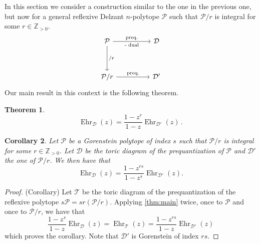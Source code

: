 \documentclass[a4paper,11pt,reqno]{amsart}
\DeclareMathOperator{\Ehr}{Ehr}
\newtheorem{theorem}{Theorem}[section]
\newtheorem{corollary}[theorem]{Corollary}
\begin{document}
In this section we consider a construction similar to the one in the previous one, but now for a 
general reflexive Delzant $n$-polytope $\mathcal{P}$ such that $\mathcal{P}/r$ is integral for some $r \in \mathbb{Z}_{>0}$.
\[\begin{tikzcd}
	{\mathcal{P}} && {\mathcal{D}} \\
	\\
	{\mathcal{P}/r} && {\mathcal{D}'}
	\arrow["{\text{preq.}}", "{\text{- dual}}"', from=1-1, to=1-3]
	\arrow["{/r}", from=1-1, to=3-1]
	\arrow["{\text{preq.}}", from=3-1, to=3-3]
\end{tikzcd}\]
Our main result in this context is the following theorem.
\begin{theorem} \label{thm:main}
\[
\Ehr_{\mathcal{D}}(z)=\frac{1-z^r}{1-z}\Ehr_{\mathcal{D}'}(z) \,.
\]
\end{theorem}
\begin{corollary}\label{cor:1}
Let $\mathcal{P}$ be a Gorenstein polytope of index $s$ such that $\mathcal{P}/r$ is integral for some 
$r \in \mathbb{Z}_{>0}$. Let $\mathcal{D}$ be the toric diagram of the prequantization of $\mathcal{P}$ and 
$\mathcal{D}'$ the one of $\mathcal{P}/r$. We then have that
\[
\Ehr_{\mathcal{D}}(z)=\frac{1-z^{rs}}{1-z^s}\Ehr_{\mathcal{D}'}(z).
\]
\end{corollary}
\begin{proof}{(Corollary)}
Let $\mathcal{T}$ be the toric diagram of the prequantization of the reflexive polytope 
$s\mathcal{P}=sr(\mathcal{P}/r)$. Applying \autoref{thm:main} twice, once to $\mathcal{P}$ 
and once to $\mathcal{P}/r$, we have that
\[
\frac{1-z^s}{1-z}\Ehr_{\mathcal{D}}(z)=\Ehr_{\mathcal{T}}(z)=\frac{1-z^{rs}}{1-z}\Ehr_{\mathcal{D}'}(z)
\]
which proves the corollary. Note that $\mathcal{D}'$ is Gorenstein of index $rs$.
\end{proof}
\end{document}
